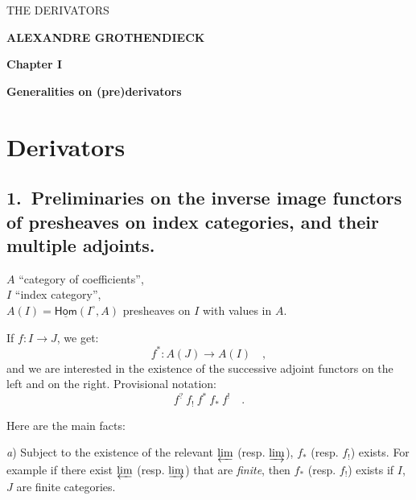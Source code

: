 \documentclass[11pt]{article}
\newcommand{\printedpage}[1]{\marginpar{\footnotesize p.~#1}}
\newcommand{\msp}[1]{\marginpar{\footnotesize [#1]}}
\newcommand{\uHom}{\underline{\mathsf{Hom}}}
\begin{document}
\printedpage{--} %

\begin{center}
{\Large\textsf{THE DERIVATORS}}

\bigskip

\textbf{ALEXANDRE GROTHENDIECK}

\bigskip\bigskip

\textbf{Chapter I}

\medskip

\textbf{Generalities on (pre)derivators}
\end{center}

\clearpage


\printedpage{1}

\msp{page 1}

\section*{Derivators}

\subsection*{\textmd{1.}\ Preliminaries on the inverse image functors of presheaves on index categories, and their multiple adjoints.}

$A$ ``category of coefficients'',\\
$I$ ``index category'',\\
$A(I)=\uHom(I^{\circ},A)$ presheaves on $I$ with values in $A$.

If $f : I \to J$, we get:
\[
f^{*} : A(J) \to A(I) \quad ,
\]
and we are interested in the existence of the successive adjoint functors on the left and on the right. Provisional notation:
\[
f^{?}\ f_{!}\ f^{*}\ f_{*}\ f^{!} \quad .
\]

Here are the main facts:

\textit{a}) Subject to the existence of the relevant $\varprojlim$ (resp. $\varinjlim$), $f_{*}$ (resp. $f_{!}$) exists. For example if there exist $\varprojlim$ (resp. $\varinjlim$) that are \textit{finite}, then $f_{*}$ (resp. $f_{!}$) exists if $I$, $J$ are finite categories.
\end{document}
